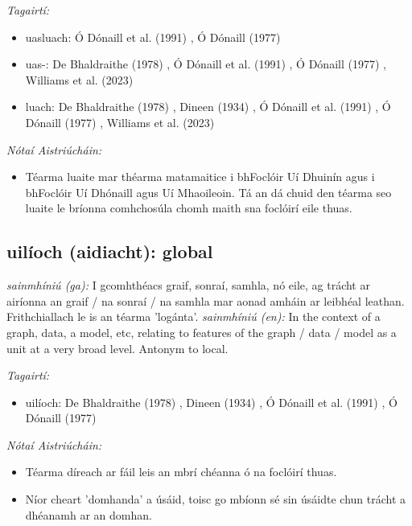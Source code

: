 \documentclass{article}
\begin{document}
 \noindent \textit{Tagairtí:}
\begin{itemize}
	\item uasluach: Ó Dónaill et al. (1991) \cite{focloir-beag}, Ó Dónaill (1977) \cite{odonaill}
	\item uas-: De Bhaldraithe (1978) \cite{de-bhaldraithe}, Ó Dónaill et al. (1991) \cite{focloir-beag}, Ó Dónaill (1977) \cite{odonaill}, Williams et al. (2023) \cite{storchiste}
	\item luach: De Bhaldraithe (1978) \cite{de-bhaldraithe}, Dineen (1934) \cite{dineen}, Ó Dónaill et al. (1991) \cite{focloir-beag}, Ó Dónaill (1977) \cite{odonaill}, Williams et al. (2023) \cite{storchiste}
\end{itemize}

 \noindent \textit{Nótaí Aistriúcháin:}
\begin{itemize}
	\item Téarma luaite mar théarma matamaitice i bhFoclóir Uí Dhuinín agus i bhFoclóir Uí Dhónaill agus Uí Mhaoileoin. Tá an dá chuid den téarma seo luaite le bríonna comhchosúla chomh maith sna foclóirí eile thuas.
\end{itemize}


\subsection*{uilíoch (aidiacht): global} 
 \noindent \textit{sainmhíniú (ga):} I gcomhthéacs graif, sonraí, samhla, nó eile, ag trácht ar airíonna an graif / na sonraí / na samhla mar aonad amháin ar leibhéal leathan. Frithchiallach le is an téarma 'logánta'.
\newline\newline
 \noindent \textit{sainmhíniú (en):} In the context of a graph, data, a model, etc, relating to features of the graph / data / model as a unit at a very broad level. Antonym to local.
\newline

 \noindent \textit{Tagairtí:}
\begin{itemize}
	\item uilíoch: De Bhaldraithe (1978) \cite{de-bhaldraithe}, Dineen (1934) \cite{dineen}, Ó Dónaill et al. (1991) \cite{focloir-beag}, Ó Dónaill (1977) \cite{odonaill}
\end{itemize}

 \noindent \textit{Nótaí Aistriúcháin:}
\begin{itemize}
	\item Téarma díreach ar fáil leis an mbrí chéanna ó na foclóirí thuas.
	\item Níor cheart 'domhanda' a úsáid, toisc go mbíonn sé sin úsáidte chun trácht a dhéanamh ar an domhan.
\end{itemize}
\end{document}
